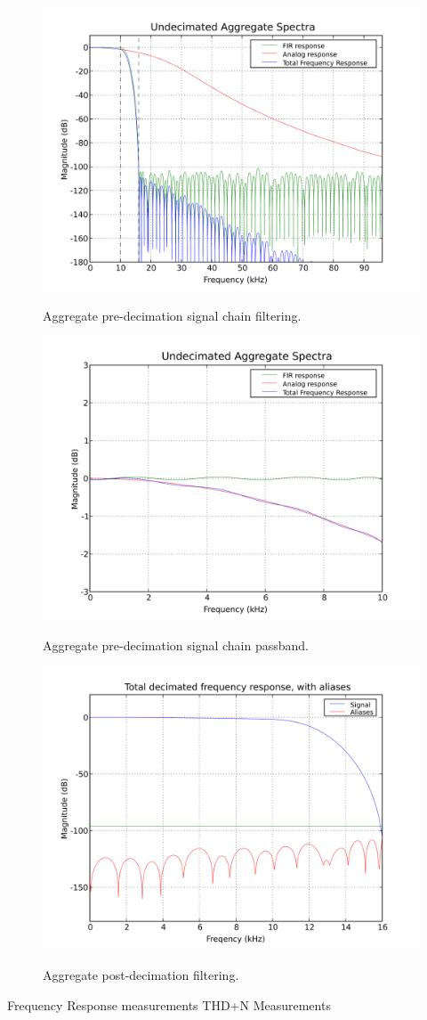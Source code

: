 \begin{figure}[h!]
  \includegraphics[scale=1.0]{soma-1.digital.aggregate.svg}
  \label{digital.aggregate}
  \caption{Aggregate pre-decimation signal chain filtering.}
  \includegraphics[scale=1.0]{soma-1.digital.pass.svg}
  \label{digital.pass}
  \caption{Aggregate pre-decimation signal chain passband.}
\end{figure}


\begin{figure}[h!]
  \includegraphics[scale=1.0]{soma-1.digital.withaliases.svg}
  \label{digital.withaliases}
  \caption{Aggregate post-decimation filtering.}
\end{figure}


Frequency Response measurements THD+N Measurements

